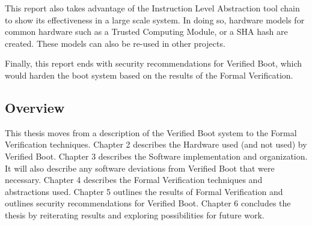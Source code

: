 \documentclass[../report.tex]{subfiles}
\begin{document}
This report also takes advantage of the Instruction Level Abstraction tool chain
to show its effectiveness in a large scale system.
In doing so, hardware models for common hardware such as a Trusted Computing
Module, or a SHA hash are created.
These models can also be re-used in other projects.

Finally, this report ends with security recommendations for Verified Boot, which
would harden the boot system based on the results of the Formal Verification.

\subsection{Overview}

This thesis moves from a description of the Verified Boot system to the Formal
Verification techniques.
Chapter 2 describes the Hardware used (and not used) by Verified Boot.
Chapter 3 describes the Software implementation and organization.
It will also describe any software deviations from Verified Boot that were
necessary.
Chapter 4 describes the Formal Verification techniques and abstractions used.
Chapter 5 outlines the results of Formal Verification and outlines security
recommendations for Verified Boot.
Chapter 6 concludes the thesis by reiterating results and exploring
possibilities for future work.
\end{document}
